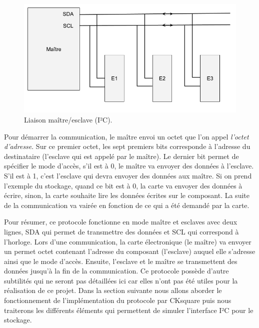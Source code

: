 \documentclass[a4paper]{article}
\begin{document}
\begin{figure}[h!]
  \begin{center}
    \includegraphics[scale=0.4]{./img/schema-i2c.png}
    \caption{Liaison maître/esclave (I²C).}
    \label{fig:schemai2c}
  \end{center}
\end{figure}

Pour démarrer la communication, le maître envoi un octet que l'on appel
\textit{l'octet d'adresse}. Sur ce premier octet, les sept premiers bits
corresponde à l'adresse du destinataire (l'esclave qui est appelé par le
maître). Le dernier bit permet de spécifier le mode d'accès, s'il est à 0, le
maître va envoyer des données à l'esclave. S'il est à 1, c'est l'esclave qui
devra envoyer des données aux maître. Si on prend l'exemple du stockage, quand
ce bit est à 0, la carte va envoyer des données à écrire, sinon, la carte
souhaite lire les données écrites sur le composant. La suite de la communication
va vairée en fonction de ce qui a été demandé par la carte.

Pour résumer, ce protocole fonctionne en mode maître et esclaves avec deux
lignes, SDA qui permet de transmettre des données et SCL qui correspond à
l'horloge. Lors d'une communication, la carte électronique (le maître) va
envoyer un permet octet contenant l'adresse du composant (l'esclave) auquel elle
s'adresse ainsi que le mode d'accès. Ensuite, l'esclave et le maître se
transmettent des données jusqu'à la fin de la communication. Ce protocole
possède d'autre subtilités qui ne seront pas détaillées ici car elles n'ont pas
été utiles pour la réalisation de ce projet. Dans la section suivante nous
allons aborder le fonctionnement de l'implémentation du protocole par CKsquare
puis nous traiterons les différents éléments qui permettent de simuler
l'interface I²C pour le stockage.
\end{document}
